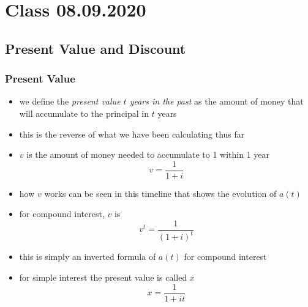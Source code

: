 \documentclass[../00_main.tex]{subfiles}
\begin{document}
\section{Class 08.09.2020}

\subsection{Present Value and Discount}

\subsubsection{Present Value}

\begin{itemize}
    \item we define the \textit{present value $t$ years in the past} as the
        amount of money that will accumulate to the principal in $t$ years
    \item this is the reverse of what we have been calculating thus far\\
    \item $v$ is the amount of money needed to accumulate to 1 within 1 year
        \begin{equation}\nonumber
            v = \frac{1}{1+i}
        \end{equation}
    \item how $v$ works can be seen in this timeline that shows the evolution
        of $a(t)$\\
    \item for compound interest, $v$ is
        \begin{equation}
            v^t = \frac{1}{(1+i)^t}
        \end{equation}
    \item this is simply an inverted formula of $a(t)$ for compound interest
    \item for simple interest the present value is called $x$
        \begin{equation}\nonumber
            x = \frac{1}{1+it}
        \end{equation}
\end{itemize}
\end{document}
